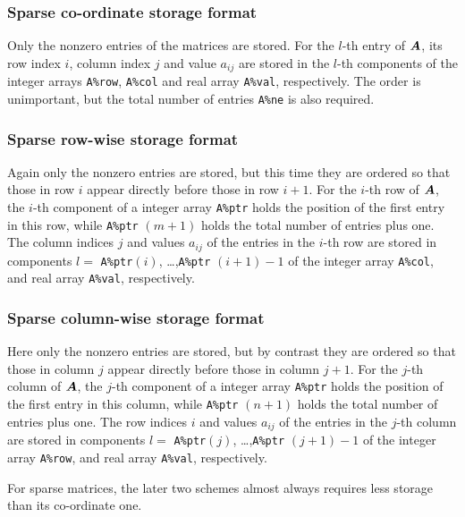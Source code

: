 \documentclass{galahad}
\begin{document}
\subsubsection{Sparse co-ordinate storage format}\label{coordinate}
Only the nonzero entries of the matrices are stored. For the 
$l$-th entry of ${\bm{A}}$, its row index $i$, column index $j$ 
and value $a_{ij}$
are stored in the $l$-th components of the integer arrays {\tt A\%row}, 
{\tt A\%col} and real array {\tt A\%val}, respectively.
The order is unimportant, but the total
number of entries {\tt A\%ne} is also required. 

\subsubsection{Sparse row-wise storage format}\label{rowwise}
Again only the nonzero entries are stored, but this time
they are ordered so that those in row $i$ appear directly before those
in row $i+1$. For the $i$-th row of ${\bm{A}}$, the $i$-th component of a 
integer array {\tt A\%ptr} holds the position of the first entry in this row,
while {\tt A\%ptr} $(m+1)$ holds the total number of entries plus one.
The column indices $j$ and values $a_{ij}$ of the entries in the $i$-th row 
are stored in components 
$l =$ {\tt A\%ptr}$(i)$, \ldots ,{\tt A\%ptr} $(i+1)-1$ of the 
integer array {\tt A\%col}, and real array {\tt A\%val}, respectively. 

\subsubsection{Sparse column-wise storage format}\label{colwise}
Here only the nonzero entries are stored, but by contrast
they are ordered so that those in column $j$ appear directly before those
in column $j+1$. For the $j$-th column of ${\bm{A}}$, the $j$-th component of a 
integer array {\tt A\%ptr} holds the position of the first entry in this column,
while {\tt A\%ptr} $(n+1)$ holds the total number of entries plus one.
The row indices $i$ and values $a_{ij}$ of the entries in the $j$-th column
are stored in components 
$l =$ {\tt A\%ptr}$(j)$, \ldots ,{\tt A\%ptr} $(j+1)-1$ of the 
integer array {\tt A\%row}, and real array {\tt A\%val}, respectively. 

For sparse matrices, the later two schemes almost always requires less storage 
than its co-ordinate one.



\end{document}
